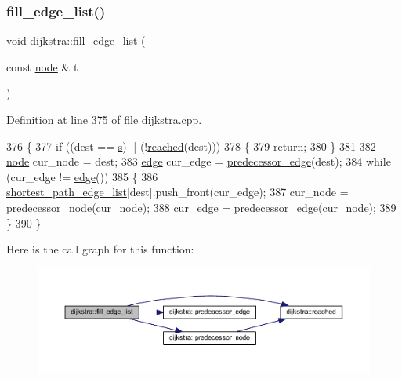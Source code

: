 \subsubsection{\texorpdfstring{fill\+\_\+edge\+\_\+list()}{fill\_edge\_list()}}
{\footnotesize\ttfamily void dijkstra\+::fill\+\_\+edge\+\_\+list (\begin{DoxyParamCaption}\item[{const \mbox{\hyperlink{classnode}{node}} \&}]{t }\end{DoxyParamCaption})\hspace{0.3cm}{\ttfamily [private]}}



Definition at line 375 of file dijkstra.\+cpp.


\begin{DoxyCode}
376 \{
377     \textcolor{keywordflow}{if} ((dest == \mbox{\hyperlink{classdijkstra_a721bfb648626a1be2b9d276d85ebdb9d}{s}}) || (!\mbox{\hyperlink{classdijkstra_a405ff80abfc9ad98668534032eed6a5b}{reached}}(dest)))
378     \{
379     \textcolor{keywordflow}{return};
380     \}
381 
382     \mbox{\hyperlink{classnode}{node}} cur\_node = dest;
383     \mbox{\hyperlink{classedge}{edge}} cur\_edge = \mbox{\hyperlink{classdijkstra_aa3ef1a7d7dfc33e4a39aff309f873929}{predecessor\_edge}}(dest);
384     \textcolor{keywordflow}{while} (cur\_edge != \mbox{\hyperlink{classedge}{edge}}())
385     \{
386     \mbox{\hyperlink{classdijkstra_a4c647f083ee4d12327e5c1ea3bf2e7c2}{shortest\_path\_edge\_list}}[dest].push\_front(cur\_edge);
387     cur\_node = \mbox{\hyperlink{classdijkstra_a99c17ee7c2b55574ea8c2952fac09faf}{predecessor\_node}}(cur\_node);
388     cur\_edge = \mbox{\hyperlink{classdijkstra_aa3ef1a7d7dfc33e4a39aff309f873929}{predecessor\_edge}}(cur\_node);
389     \}
390 \}
\end{DoxyCode}
Here is the call graph for this function\+:\nopagebreak
\begin{figure}[H]
\begin{center}
\leavevmode
\includegraphics[width=350pt]{classdijkstra_ab2dfb6e0c2b9084fa17e2e6349e20ad9_cgraph}
\end{center}
\end{figure}
